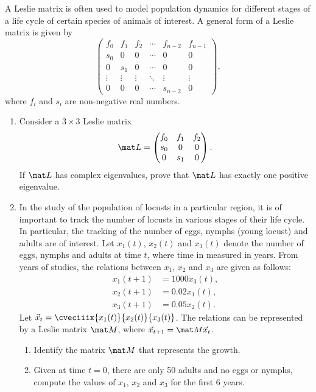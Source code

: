 \begin{problem}
    A Leslie matrix is often used to model population dynamics for different stages of a life cycle of certain species of animals of interest. A general form of a Leslie matrix is given by \[\begin{pmatrix}f_0 & f_1 & f_2 & \cdots & f_{n-2} & f_{n-1} \\ s_0 & 0 & 0 & \cdots & 0 & 0 \\ 0 & s_1 & 0 & \cdots & 0 & 0 \\ \vdots & \vdots & \vdots & \ddots & \vdots & \vdots \\ 0 & 0 & 0 & \cdots & s_{n-2} & 0 \end{pmatrix},\] where $f_i$ and $s_i$ are non-negative real numbers.

    \begin{enumerate}
        \item Consider a $3 \times 3$ Leslie matrix \[\mat L = \begin{pmatrix}f_0 & f_1 & f_2 \\ s_0 & 0 & 0 \\ 0 & s_1 & 0 \end{pmatrix}.\] If $\mat L$ has complex eigenvalues, prove that $\mat L$ has exactly one positive eigenvalue.
        \item In the study of the population of locusts in a particular region, it is of important to track the number of locusts in various stages of their life cycle. In particular, the tracking of the number of eggs, nymphs (young locust) and adults are of interest. Let $x_1(t)$, $x_2(t)$ and $x_3(t)$ denote the number of eggs, nymphs and adults at time $t$, where time in measured in years. From years of studies, the relations between $x_1$, $x_2$ and $x_3$ are given as follows:
        \begin{align*}
            x_1(t+1) &= 1000 x_3(t),\\
            x_2(t+1) &= 0.02 x_1(t),\\
            x_3(t+1) &= 0.05 x_2(t).
        \end{align*}
        Let $\vec x_t = \cveciiix{x_1(t)}{x_2(t)}{x_3(t)}$. The relations can be represented by a Leslie matrix $\mat M$, where $\vec x_{t+1} = \mat M \vec x_t$.
        \begin{enumerate}
            \item Identify the matrix $\mat M$ that represents the growth.
            \item Given at time $t = 0$, there are only 50 adults and no eggs or nymphs, compute the values of $x_1$, $x_2$ and $x_3$ for the first 6 years.

\end{enumerate}
\end{enumerate}
\end{problem}
